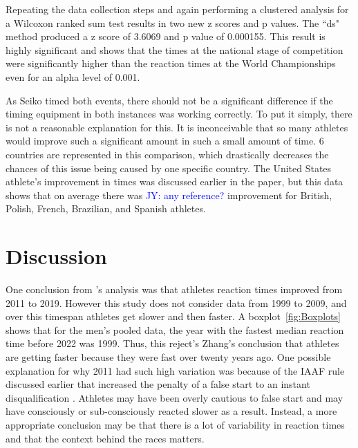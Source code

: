 \documentclass[12pt, letterpaper, titlepage]{article}
\newcommand{\jy}[1]{\textcolor{blue}{JY: #1}}
\begin{document}
Repeating the data collection steps and
again performing a clustered analysis for a Wilcoxon ranked sum test
results in two new z scores and p values.  The ``ds" method produced a z score of
3.6069 and p value of 0.000155.  This result is highly significant and shows that
the times at the national stage of competition were significantly higher than
the reaction times at the World Championships even for an alpha level of 0.001.

As Seiko timed both events, there should not be a significant
difference if the timing equipment in both instances was working correctly.
  To put it simply, there is not a reasonable explanation for 
this. It is inconceivable that so many athletes would improve such a significant
amount in such a small amount of time. 6 countries are represented in this 
comparison, which drastically decreases the chances of this issue being caused by
one specific country.  The United States athlete's improvement in times was
discussed earlier in the paper, but this data shows that on average there was
\jy{any reference?}
improvement for British, Polish, French, Brazilian, and Spanish athletes.


\section{Discussion}\label{sec:Discussion}

One conclusion from \citet{zhang2021correlation}'s analysis was that athletes
reaction times improved from 2011 to 2019.  However this study does not consider 
data from 1999 to 2009, and over this timespan athletes get slower and then
faster.  A boxplot~\ref{fig:Boxplots} shows that for the men's pooled data, the 
year with the fastest median reaction time before 2022 was 1999.  Thus, this 
reject's Zhang's conclusion that athletes are getting faster because they were 
fast over twenty years ago. One possible explanation for why 2011 had such
high variation was because of the IAAF rule discussed earlier that increased the
penalty of a false start to an instant disqualification \citep{iaaf2009falsestart}.
Athletes may have been overly cautious to false start and may have consciously
or sub-consciously reacted slower as a result.  Instead, a more appropriate 
conclusion may be that there is a lot of variability in reaction times and that
the context behind the races matters.
\end{document}
